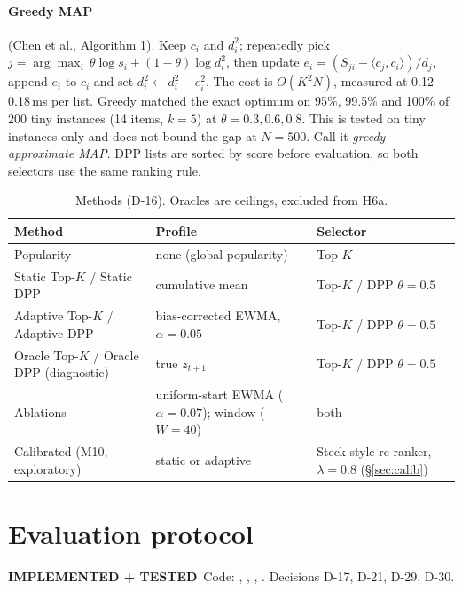 \documentclass[11pt,a4paper]{article}
\newcommand{\statustag}[2]{\colorbox{#1}{\scriptsize\sffamily\bfseries #2}}
\newcommand{\implemented}{\statustag{blue!12}{IMPLEMENTED + TESTED}}
\begin{document}
\paragraph{Greedy MAP} (Chen et al., Algorithm 1). Keep $c_i$ and $d_i^2$; repeatedly pick
$j=\arg\max_i\,\theta\log s_i+(1-\theta)\log d_i^2$, then update
$e_i=(S_{ji}-\langle c_j,c_i\rangle)/d_j$, append $e_i$ to $c_i$ and set
$d_i^2\leftarrow d_i^2-e_i^2$. The cost is $O(K^2N)$, measured at 0.12--0.18\,ms per list.
Greedy matched the exact optimum on 95\%, 99.5\% and 100\% of 200 tiny instances (14 items,
$k=5$) at $\theta=0.3,0.6,0.8$. This is tested on tiny instances only and does not bound the
gap at $N=500$. Call it \emph{greedy approximate MAP}. DPP lists are sorted by score before
evaluation, so both selectors use the same ranking rule.

\begin{table}[h]\centering\small
\begin{tabular}{lll}
\toprule
Method & Profile & Selector \\
\midrule
Popularity & none (global popularity) & Top-$K$ \\
Static Top-$K$ / Static DPP & cumulative mean & Top-$K$ / DPP $\theta=0.5$ \\
Adaptive Top-$K$ / Adaptive DPP & bias-corrected EWMA, $\alpha=0.05$ & Top-$K$ / DPP $\theta=0.5$ \\
Oracle Top-$K$ / Oracle DPP (diagnostic) & true $z_{t+1}$ & Top-$K$ / DPP $\theta=0.5$ \\
Ablations & uniform-start EWMA ($\alpha=0.07$); window ($W=40$) & both \\
Calibrated (M10, exploratory) & static or adaptive & Steck-style re-ranker, $\lambda=0.8$ (\S\ref{sec:calib}) \\
\bottomrule
\end{tabular}
\caption{Methods (D-16). Oracles are ceilings, excluded from H6a.}
\end{table}

\section{Evaluation protocol}\label{sec:eval}
\implemented\ Code: , , ,
. Decisions D-17, D-21, D-29, D-30.
\end{document}
